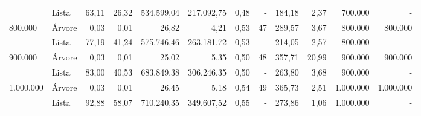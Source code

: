 \begin{tabular}{llrrrrrrrrrr}
 & Lista & 63,11 & 26,32 & 534.599,04 & 217.092,75 & 0,48 & - & 184,18 & 2,37 & 700.000 & - \\
\cline{1-12}
\multirow[c]{2}{*}{800.000} & Árvore & 0,03 & 0,01 & 26,82 & 4,21 & 0,53 & 47 & 289,57 & 3,67 & 800.000 & 800.000 \\
 & Lista & 77,19 & 41,24 & 575.746,46 & 263.181,72 & 0,53 & - & 214,05 & 2,57 & 800.000 & - \\
\cline{1-12}
\multirow[c]{2}{*}{900.000} & Árvore & 0,03 & 0,01 & 25,02 & 5,35 & 0,50 & 48 & 357,71 & 20,99 & 900.000 & 900.000 \\
 & Lista & 83,00 & 40,53 & 683.849,38 & 306.246,35 & 0,50 & - & 263,80 & 3,68 & 900.000 & - \\
\cline{1-12}
\multirow[c]{2}{*}{1.000.000} & Árvore & 0,03 & 0,01 & 26,45 & 5,18 & 0,54 & 49 & 365,73 & 2,51 & 1.000.000 & 1.000.000 \\
 & Lista & 92,88 & 58,07 & 710.240,35 & 349.607,52 & 0,55 & - & 273,86 & 1,06 & 1.000.000 & - \\
\bottomrule
\end{tabular}